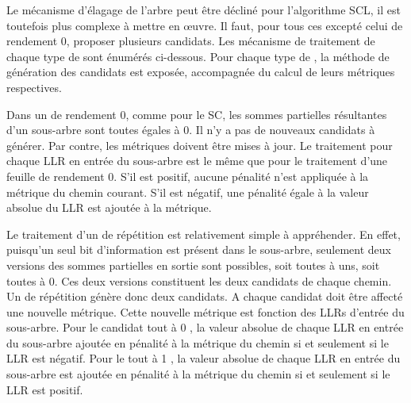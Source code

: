 Le mécanisme d'élagage de l'arbre peut être décliné pour l'algorithme SCL, il est toutefois plus complexe à mettre en œuvre. Il faut, pour tous ces \noeud excepté celui de rendement 0, proposer plusieurs candidats. Les mécanisme de traitement de chaque type de \noeud sont énumérés ci-dessous. Pour chaque type de \noeud, la méthode de génération des candidats est exposée, accompagnée du calcul de leurs métriques respectives.

Dans un \noeud de rendement 0, comme pour le SC, les sommes partielles résultantes d'un sous-arbre sont toutes égales à 0. Il n'y a pas de nouveaux candidats à générer. Par contre, les métriques doivent être mises à jour. Le traitement pour chaque LLR en entrée du sous-arbre est le même que pour le traitement d'une feuille de rendement 0. S'il est positif, aucune pénalité n'est appliquée à la métrique du chemin courant. S'il est négatif, une pénalité égale à la valeur absolue du LLR est ajoutée à la métrique. 

Le traitement d'un \noeud de répétition est relativement simple à appréhender. En effet, puisqu'un seul bit d'information est présent dans le sous-arbre, seulement deux versions des sommes partielles en sortie sont possibles, soit toutes à uns, soit toutes à 0. Ces deux versions constituent les deux candidats de chaque chemin. Un \noeud de répétition génère donc deux candidats. A chaque candidat doit être affecté une nouvelle métrique. Cette nouvelle métrique est fonction des LLRs d'entrée du sous-arbre. Pour le candidat \og tout à 0 \fg, la valeur absolue de chaque LLR en entrée du sous-arbre ajoutée en pénalité à la métrique du chemin si et seulement si le LLR est négatif. Pour le \noeud \og tout à 1 \fg, la valeur absolue de chaque LLR en entrée du sous-arbre est ajoutée en pénalité à la métrique du chemin si et seulement si le LLR est positif.

